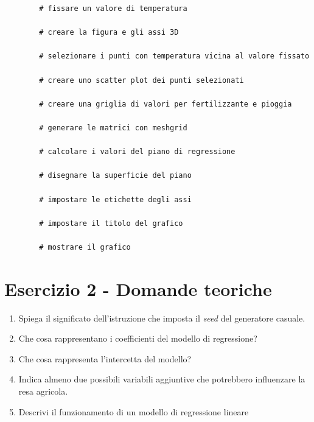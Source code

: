 \documentclass[a4paper,12pt]{article}
\begin{document}
\begin{lstlisting}
		# fissare un valore di temperatura
		
		# creare la figura e gli assi 3D
		
		# selezionare i punti con temperatura vicina al valore fissato
		
		# creare uno scatter plot dei punti selezionati
		
		# creare una griglia di valori per fertilizzante e pioggia
		
		# generare le matrici con meshgrid
		
		# calcolare i valori del piano di regressione
		
		# disegnare la superficie del piano
		
		# impostare le etichette degli assi
		
		# impostare il titolo del grafico
		
		# mostrare il grafico
	\end{lstlisting}
	
	\newpage
	
	\section*{Esercizio 2 - Domande teoriche}
	
	\begin{enumerate}
		
		\item Spiega il significato dell'istruzione che imposta il \textit{seed} del generatore casuale.
		
		\item Che cosa rappresentano i coefficienti del modello di regressione?
		
		\item Che cosa rappresenta l'intercetta del modello?
		
		\item Indica almeno due possibili variabili aggiuntive che potrebbero influenzare la resa agricola.
		
		\item Descrivi il funzionamento di un modello di regressione lineare
		
	\end{enumerate}
	
	

	
\end{document}
